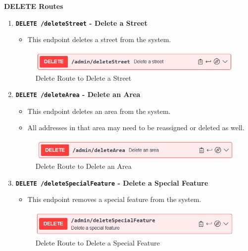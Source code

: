     \textbf{DELETE Routes}
    \begin{enumerate}
        \item \textbf{\texttt{DELETE /deleteStreet} - Delete a Street}
        \begin{itemize}
            \item This endpoint deletes a street from the system.
        \end{itemize} 
        \begin{figure} [H]
            \centering
            \includegraphics [width=1\textwidth] {images/andreas/praxis/deleteStreet.png}
            \caption{Delete Route to Delete a Street}
        \end{figure}

        \item \textbf{\texttt{DELETE /deleteArea} - Delete an Area}
        \begin{itemize}
            \item This endpoint deletes an area from the system.
            \item All addresses in that area may need to be reassigned or deleted as well.
        \end{itemize} 
        \begin{figure} [H]
            \centering
            \includegraphics [width=1\textwidth] {images/andreas/praxis/deleteArea.png}
            \caption{Delete Route to Delete an Area}
        \end{figure}

        \item \textbf{\texttt{DELETE /deleteSpecialFeature} - Delete a Special Feature}
        \begin{itemize}
            \item This endpoint removes a special feature from the system.
        \end{itemize} 
        \begin{figure} [H]
            \centering
            \includegraphics [width=1\textwidth] {images/andreas/praxis/deleteSF.png}
            \caption{Delete Route to Delete a Special Feature}
        \end{figure}


\end{enumerate}
